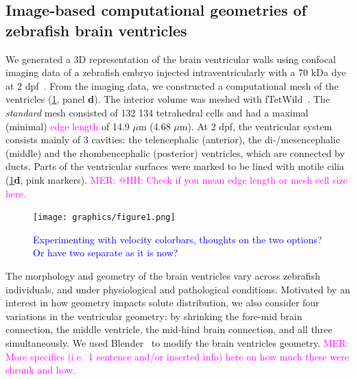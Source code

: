 \documentclass[fleqn]{wlscirep}
\newcommand{\lyng}[1]{\textcolor{blue}{#1}}
\newcommand{\mer}[1]{\textcolor{magenta}{#1}}
\begin{document}
\subsection*{Image-based computational geometries of zebrafish brain ventricles}
We generated a 3D representation of the brain ventricular walls using confocal imaging data of a zebrafish embryo injected intraventricularly with a 70 kDa dye at 2 dpf~\cite{Olstad2019CiliaryDevelopment}. From the imaging data, we constructed a computational mesh of the ventricles (\cref{fig:figure1}, panel \textbf{d}). The interior volume was meshed with fTetWild~\cite{Hu2020FastWild}. The \emph{standard} mesh consisted of 132 134 tetrahedral cells and had a maximal (minimal) \mer{edge length} of 14.9 $\mu$m (4.68 $\mu$m). At 2 dpf, the ventricular system consists mainly of 3 cavities: the telencephalic  (anterior), the di-/mesencephalic  (middle) and the rhombencephalic (posterior) ventricles, which are connected by ducts. Parts of the ventricular surfaces were marked to be lined with motile cilia~\cite{Olstad2019CiliaryDevelopment} (\cref{fig:figure1}\textbf{d}, pink markers).
\mer{MER: @HH: Check if you mean edge length or mesh cell size here.}
\begin{figure}%
    \centering
    \texttt{[image: graphics/figure1.png]}
    \caption{\lyng{Experimenting with velocity colorbars, thoughts on the two options? Or have two separate as it is now?}}
    \label{fig:figure1}
\end{figure}

The morphology and geometry of the brain ventricles vary across zebrafish individuals, and under physiological and pathological conditions. Motivated by an interest in how geometry impacts solute distribution, we also consider four variations in the ventricular geometry: by shrinking the fore-mid brain connection, the middle ventricle, the mid-hind brain connection, and all three simultaneously. We used Blender~\cite{Community2018BlenderPackage} to modify the brain ventricles geometry. \mer{MER: More specifics (i.e.~1 sentence and/or inserted info) here on how much these were shrunk and how.}

\end{document}

